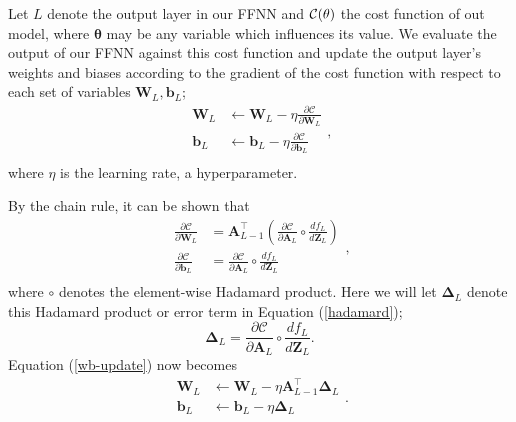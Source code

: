 \documentclass[]{article}
\begin{document}
Let $L$ denote the output layer in our FFNN and $\cal{C}(\mathbf{\theta})$ the cost function of out model, where $\mathbf{\theta}$ may be any variable which influences its value. We evaluate the output of our FFNN against this cost function and update the output layer's weights and biases according to the gradient of the cost function with respect to each set of variables $\mathbf{W}_L, \mathbf{b}_L$;
\begin{equation} \label{wb-update}
\begin{aligned}
		\mathbf{W}_L &\leftarrow \mathbf{W}_L - \eta \frac{\partial \mathcal{C}}{\partial \mathbf{W}_L} \\
		\mathbf{b}_L &\leftarrow \mathbf{b}_L - \eta \frac{\partial \mathcal{C}}{\partial \mathbf{b}_L} \\
\end{aligned},
\end{equation}
where $\eta$ is the learning rate, a hyperparameter.

By the chain rule, it can be shown that
\begin{equation} \label{hadamard}
\begin{aligned}
	\frac{\partial \mathcal{C}}{\partial \mathbf{W}_L} &= 
	\mathbf{A}_{L-1}^\intercal \left(\frac{\partial \mathcal{C}}{\partial \mathbf{A}_L} \circ \frac{df_L}{d\mathbf{Z}_L} \right) \\
	\frac{\partial \mathcal{C}}{\partial \mathbf{b}_L} &= 
	\frac{\partial \mathcal{C}}{\partial \mathbf{A}_L} \circ \frac{df_L}{d\mathbf{Z}_L} \\
\end{aligned},
\end{equation}
where $\circ$ denotes the element-wise Hadamard product. Here we will let $\mathbf{\Delta}_L$ denote this Hadamard product or error term in Equation (\ref{hadamard});
\begin{equation} \label{delta-L}
	\mathbf{\Delta}_L = \frac{\partial \mathcal{C}}{\partial \mathbf{A}_L} \circ \frac{df_L}{d\mathbf{Z}_L}.
\end{equation}
Equation (\ref{wb-update}) now becomes
\begin{equation}
\begin{aligned}
	\mathbf{W}_L &\leftarrow \mathbf{W}_L - \eta \mathbf{A}_{L-1}^\intercal \mathbf{\Delta}_L \\
	\mathbf{b}_L &\leftarrow \mathbf{b}_L - \eta \mathbf{\Delta}_L \\
\end{aligned}.
\end{equation}
\end{document}
